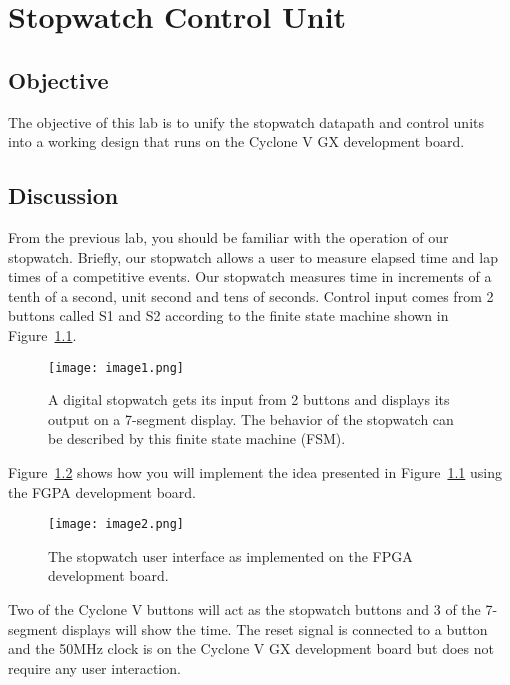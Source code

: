 \chapter{Stopwatch Control Unit}
\label{chapter:stopControl}
\graphicspath{ {./Lab11Stopwatch/Fig} }

\hypertarget{objective}{%
\section{Objective }\label{section:swComplete}}

The objective of this lab is to unify the stopwatch datapath and control
units into a working design that runs on the Cyclone V GX development
board.

\section{Discussion}

From the previous lab, you should be familiar with the operation of our
stopwatch. Briefly, our stopwatch allows a user to measure elapsed time
and lap times of a competitive events. Our stopwatch measures time in
increments of a tenth of a second, unit second and tens of seconds.
Control input comes from 2 buttons called S1 and S2 according to the
finite state machine shown in Figure~\ref{fig:swHighLevel}.

\begin{figure}[ht]
\texttt{[image: image1.png]}
\caption{A digital stopwatch gets its input from 2 buttons and displays
its output on a 7-segment display. The behavior of the stopwatch can be
described by this finite state machine (FSM).}
\label{fig:swHighLevel}
\end{figure}

Figure~\ref{fig:swDevBoard} shows how you will implement the idea presented in Figure~\ref{fig:swHighLevel}
using the FGPA development board.

\begin{figure}[ht]
\texttt{[image: image2.png]}
\caption{The stopwatch user interface as implemented on the FPGA
development board.}
\label{fig:swDevBoard}
\end{figure}

Two of the Cyclone V buttons will act as the stopwatch buttons
and 3 of the 7-segment displays will show the time. The reset signal is
connected to a button and the 50MHz clock is on the Cyclone V GX
development board but does not require any user
interaction.

